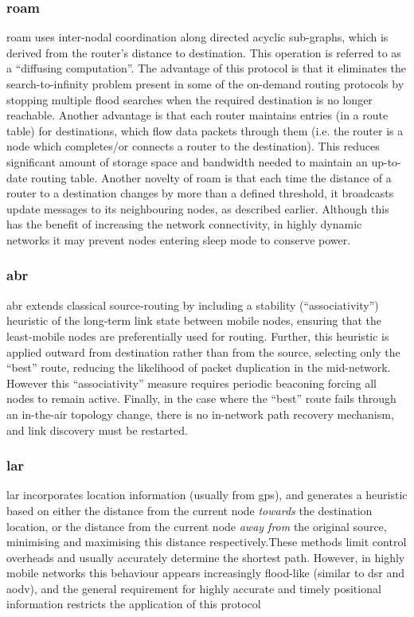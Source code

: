 {\subsubsection{\gls{roam}}
\gls{roam} uses inter-nodal coordination along directed acyclic sub-graphs, which is derived from the router’s distance to destination. This operation is referred to as a “diffusing computation”. The advantage of this protocol is that it eliminates the search-to-infinity problem present in some of the on-demand routing protocols by stopping multiple flood searches when the required destination is no longer reachable. Another advantage is that each router maintains entries (in a route table) for destinations, which flow data packets through them (i.e. the router is a node which completes/or connects a router to the destination). This reduces significant amount of storage space and bandwidth needed to maintain an up-to-date routing table. Another novelty of \gls{roam} is that each time the distance of a router to a destination changes by more than a defined threshold, it broadcasts update messages to its neighbouring nodes, as described earlier. Although this has the benefit of increasing the network connectivity, in highly dynamic networks it may prevent nodes entering sleep mode to conserve power.\\ %
\subsubsection{\gls{abr}}
\gls{abr} extends classical source-routing by including a stability (``associativity'') heuristic of the long-term link state between mobile nodes, ensuring that the least-mobile nodes are preferentially used for routing. Further, this heuristic is applied outward from destination rather than from the source, selecting only the ``best'' route, reducing the likelihood of packet duplication in the mid-network. However this ``associativity'' measure requires periodic beaconing forcing all nodes to remain active. Finally, in the case where the ``best'' route fails through an in-the-air topology change, there is no in-network path recovery mechanism, and link discovery must be restarted\cite{Toh1997}.\\
\subsubsection{\gls{lar}}
\gls{lar} incorporates location information (usually from \gls{gps}), and generates a heuristic based on either the distance from the current node \emph{towards} the destination location, or the distance from the current node \emph{away from} the original source, minimising and maximising this distance respectively.These methods limit control overheads and usually accurately determine the shortest path. However, in highly mobile networks this behaviour appears increasingly flood-like (similar to \gls{dsr} and \gls{aodv}), and the general requirement for highly accurate and timely positional information restricts the application of this protocol\\
}
